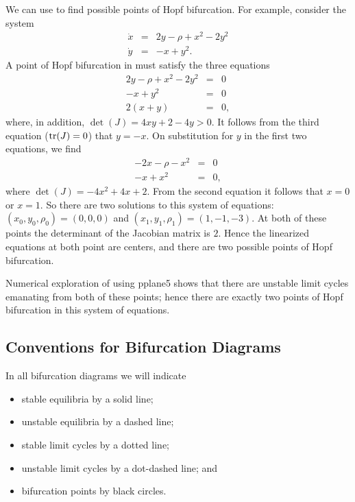 We can use  to find possible points of Hopf bifurcation.  For 
example, consider the system
\begin{equation*}  \label{E:hopfdetect}
\begin{array}{rcl}
\dot{x} & = & 2y - \rho + x^2 - 2y^2\\
\dot{y} & = & -x + y^2.
\end{array}
\end{equation*}
A point of Hopf bifurcation in  must satisfy the three 
equations
\[
\begin{array}{rcl}
2y - \rho  + x^2 - 2y^2 & = & 0\\
-x + y^2 & = & 0 \\
2(x + y)  & = & 0,
\end{array}
\]
where, in addition, $\det(J) = 4xy+2-4y>0$.  It follows from the third 
equation (${\rm tr}(J)=0$) that $y=-x$.  On substitution for $y$ in the first 
two equations, we find
\[
\begin{array}{rcl}
-2x - \rho - x^2 & = & 0\\
-x + x^2 & = & 0,
\end{array}
\]
where $\det(J) = -4x^2+4x+2$.  From the second equation it follows that $x=0$
or $x=1$.  So there are two solutions to this system of equations: 
$(x_0,y_0,\rho_0)=(0,0,0)$ and $(x_1,y_1,\rho_1)=(1,-1,-3)$.  At both of
these points the determinant of the Jacobian matrix is $2$.  Hence the
linearized equations at both point are centers, and there are two possible
points of Hopf bifurcation.

Numerical exploration of  using {\sf pplane5} shows that 
there are unstable limit cycles emanating from both of these points; hence 
there are exactly two points of Hopf bifurcation in this system of equations.



\subsection*{Conventions for Bifurcation Diagrams}

In all bifurcation diagrams we will indicate
\begin{itemize}
\item	stable equilibria by a solid line;
\item	unstable equilibria by a dashed line;
\item	stable limit cycles by a dotted line;
\item	unstable limit cycles by a dot-dashed line; and
\item	bifurcation points by black circles.
\end{itemize}

